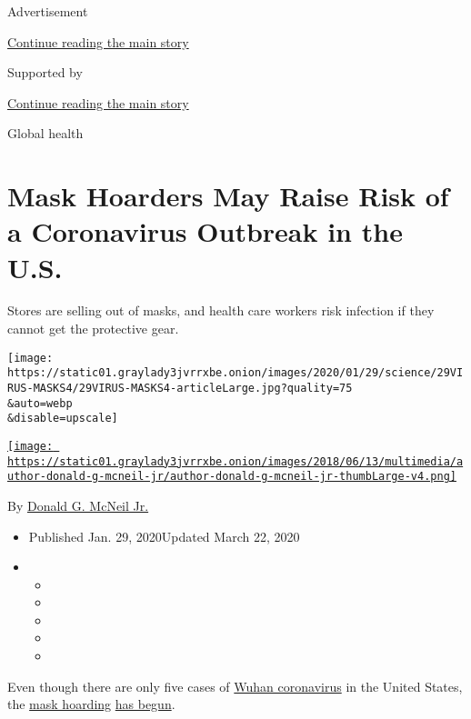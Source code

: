 Advertisement

\protect\hyperlink{after-top}{Continue reading the main story}

Supported by

\protect\hyperlink{after-sponsor}{Continue reading the main story}

Global health

\hypertarget{mask-hoarders-may-raise-risk-of-a-coronavirus-outbreak-in-the-us}{%
\section{Mask Hoarders May Raise Risk of a Coronavirus Outbreak in the
U.S.}\label{mask-hoarders-may-raise-risk-of-a-coronavirus-outbreak-in-the-us}}

Stores are selling out of masks, and health care workers risk infection
if they cannot get the protective gear.

\texttt{[image: https://static01.graylady3jvrrxbe.onion/images/2020/01/29/science/29VIRUS-MASKS4/29VIRUS-MASKS4-articleLarge.jpg?quality=75\\\&auto=webp\\\&disable=upscale]}

\href{https://www.nytimes3xbfgragh.onion/by/donald-g-mcneil-jr}{\texttt{[image: https://static01.graylady3jvrrxbe.onion/images/2018/06/13/multimedia/author-donald-g-mcneil-jr/author-donald-g-mcneil-jr-thumbLarge-v4.png]}}

By
\href{https://www.nytimes3xbfgragh.onion/by/donald-g-mcneil-jr}{Donald
G. McNeil Jr.}

\begin{itemize}
\item
  Published Jan. 29, 2020Updated March 22, 2020
\item
  \begin{itemize}
  \item
  \item
  \item
  \item
  \item
  \end{itemize}
\end{itemize}

Even though there are only five cases of
\href{https://www.nytimes3xbfgragh.onion/2020/01/30/podcasts/the-daily/coronavirus.html}{Wuhan
coronavirus} in the United States, the
\href{https://www.cnn.com/2020/01/28/health/coronavirus-us-masks-prevention-trnd/index.html}{mask
hoarding}
\href{https://finance.yahoo.com/news/china-virus-outbreak-triggers-global-082240405.html}{has
begun}.

